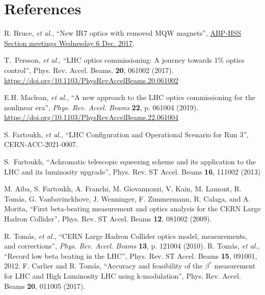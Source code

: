 \documentclass{cernatsnote}
\begin{document}

\section{References}
\begin{thebibliography}{99} %


 R. Bruce, {\it et al.}, ``New IR7 optics with removed MQW magnets'',  \href{https://indico.cern.ch/event/681507/contributions/2814548/attachments/1570845/2478033/2017.12.06--HSS_meeting_MQW_removal.pdf}{ABP-HSS Section meetings
Wednesday 6 Dec. 2017}.

 T.~Persson, {\it et al.}, ``LHC optics commissioning: A journey towards 1$\%$ optics control'', Phys. Rev. Accel. Beams, \textbf{20}, 061002 (2017).
\url{https://doi.org/10.1103/PhysRevAccelBeams.20.061002}

 E.H. Maclean, {\it et al.}, ``A new approach to the LHC optics commissioning for the nonlinear era'', {\it Phys. Rev. Accel. Beams}  {\bf 22}, p. 061004 (2019).\vspace{-0.03cm}
\url{https://doi.org/10.1103/PhysRevAccelBeams.22.061004}

 S. Fartoukh, {\it et al.}, 
	``LHC Configuration and Operational Scenario for Run 3'', CERN-ACC-2021-0007.
	
S.~Fartoukh, ``Achromatic telescopic squeezing scheme and its application to the LHC and its luminosity upgrade'', Phys. Rev. ST Accel. Beams {\bf16}, 111002 (2013)

 M. Aiba, S. Fartoukh, A. Franchi, M. Giovannozzi, V. Kain, M. Lamont, R. Tom\'as, G. Vanbavinckhove, J. Wenninger, F. Zimmermann, R. Calaga, and A. Morita, ``First beta-beating measurement and optics analysis for the CERN Large Hadron Collider'', Phys. Rev. ST Accel. Beams {\bf12}, 081002 (2009).


R. Tomás, {\it et al.}, “CERN Large Hadron Collider optics
model, measurements, and corrections”, {\it Phys. Rev. Accel. Beams}  {\bf 13}, p. 121004 (2010).
%
 R. Tom\'as, {\it et al.}, ``Record low beta beating in the LHC'',
Phys. Rev. ST Accel. Beams {\bf15}, 091001, 2012.
%
 F. Carlier and R. Tom\'as, ``Accuracy and feasibility of the $\beta^*$ measurement for LHC and High Luminosity LHC using k-modulation'',
Phys. Rev. Accel. Beams {\bf20}, 011005 (2017).
%


\end{thebibliography}
\end{document}
